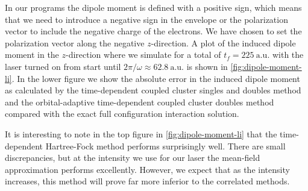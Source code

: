             In our programs the dipole moment is defined with a positive sign,
            which means that we need to introduce a negative sign in the
            envelope or the polarization vector to include the negative charge
            of the electrons.
            We have chosen to set the polarization vector along the negative
            $z$-direction.
            A plot of the induced dipole moment in the $z$-direction where we
            simulate for a total of $t_f = \SI{225}{\text{a.u.}}$ with the laser
            turned on from start until $2\pi/\omega \approx
            \SI{62.8}{\text{a.u.}}$ is shown in \autoref{fig:dipole-moment-li}.
            In the lower figure we show the absolute error in the induced dipole
            moment as calculated by the time-dependent coupled cluster singles
            and doubles method and the orbital-adaptive time-dependent coupled
            cluster doubles method compared with the exact full configuration
            interaction solution.

            It is interesting to note in the top figure in
            \autoref{fig:dipole-moment-li} that the time-dependent Hartree-Fock
            method performs surprisingly well.
            There are small discrepancies, but at the intensity we use for our
            laser the mean-field approximation performs excellently.
            However, we expect that as the intensity increases, this method will
            prove far more inferior to the correlated methods.

